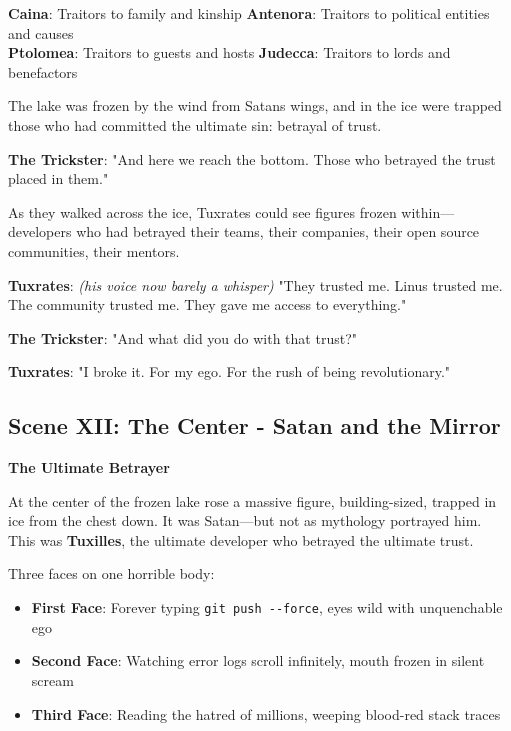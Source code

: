 \textbf{Caina}: Traitors to family and kinship \textbf{Antenora}: Traitors to political entities and causes\\
\textbf{Ptolomea}: Traitors to guests and hosts \textbf{Judecca}: Traitors to lords and benefactors

The lake was frozen by the wind from Satan\textquotesingle s wings, and in the ice were trapped those who had committed the ultimate sin: betrayal of trust.

\textbf{The Trickster}: "And here we reach the bottom. Those who betrayed the trust placed in them."

As they walked across the ice, Tuxrates could see figures frozen within---developers who had betrayed their teams, their companies, their open source communities, their mentors.

\textbf{Tuxrates}: \emph{(his voice now barely a whisper)} "They trusted me. Linus trusted me. The community trusted me. They gave me access to everything."

\textbf{The Trickster}: "And what did you do with that trust?"

\textbf{Tuxrates}: "I broke it. For my ego. For the rush of being revolutionary."

\bookdivider

\subsection{Scene XII: The Center - Satan and the Mirror}\label{scene-xii-the-center---satan-and-the-mirror}

\textbf{The Ultimate Betrayer}

At the center of the frozen lake rose a massive figure, building-sized, trapped in ice from the chest down. It was Satan---but not as mythology portrayed him. This was \textbf{Tuxilles}, the ultimate developer who betrayed the ultimate trust.

Three faces on one horrible body:

\begin{itemize}
\tightlist
\item
  \textbf{First Face}: Forever typing \texttt{git\ push\ -\/-force}, eyes wild with unquenchable ego
\item
  \textbf{Second Face}: Watching error logs scroll infinitely, mouth frozen in silent scream
\item
  \textbf{Third Face}: Reading the hatred of millions, weeping blood-red stack traces
\end{itemize}

